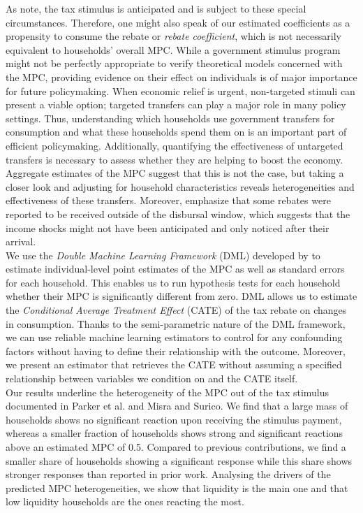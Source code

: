 As \cite{kaplanviolante_2014} note, the tax stimulus is anticipated and is subject to these special circumstances. Therefore, one might also speak of our estimated coefficients as a propensity to consume the rebate or \textit{rebate coefficient}, which is not necessarily equivalent to households' overall MPC. While a government stimulus program might not be perfectly appropriate to verify theoretical models concerned with the MPC, providing evidence on their effect on individuals is of major importance for future policymaking. When economic relief is urgent, non-targeted stimuli can present a viable option; targeted transfers can play a major role in many policy settings. Thus, understanding which households use government transfers for consumption and what these households spend them on is an important part of efficient policymaking. Additionally, quantifying the effectiveness of untargeted transfers is necessary to assess whether they are helping to boost the economy. Aggregate estimates of the MPC suggest that this is not the case, but taking a closer look and adjusting for household characteristics reveals heterogeneities and effectiveness of these transfers. Moreover, \cite{parkeretal_2013} emphasize that some rebates were reported to be received outside of the disbursal window, which suggests that the income shocks might not have been anticipated and only noticed after their arrival. \\ 
We use the \textit{Double Machine Learning Framework} (DML) developed by \cite{DML2017} to estimate individual-level point estimates of the MPC as well as standard errors for each household. This enables us to run hypothesis tests for each household whether their MPC is significantly different from zero. DML allows us to estimate the \textit{Conditional Average Treatment Effect} (CATE) of the tax rebate on changes in consumption. Thanks to the semi-parametric nature of the DML framework, we can use reliable machine learning estimators to control for any confounding factors without having to define their relationship with the outcome. Moreover, we present an estimator that retrieves the CATE without assuming a specified relationship between variables we condition on and the CATE itself. \\
Our results underline the heterogeneity of the MPC out of the tax stimulus documented in Parker et al. and Misra and Surico. We find that a large mass of households shows no significant reaction upon receiving the stimulus payment, whereas a smaller fraction of households shows strong and significant reactions above an estimated MPC of 0.5. Compared to previous contributions, we find a smaller share of households showing a significant response while this share shows stronger responses than reported in prior work. Analysing the drivers of the predicted MPC heterogeneities, we show that liquidity is the main one and that low liquidity households are the ones reacting the most. \\
